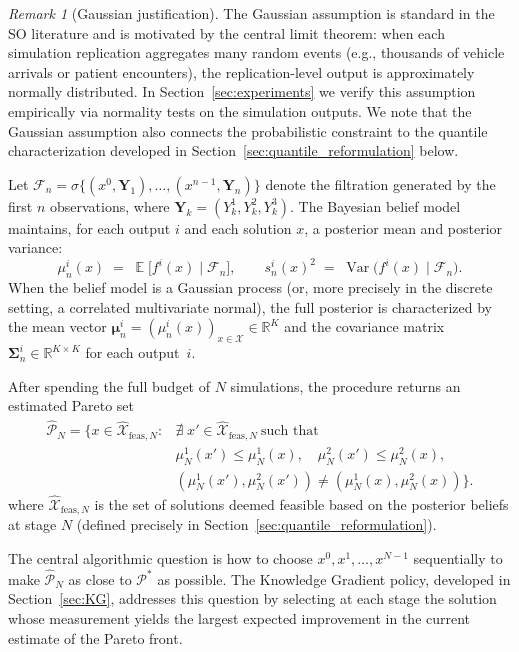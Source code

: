 \documentclass[12pt]{article}
\theoremstyle{plain}
\theoremstyle{definition}
\theoremstyle{remark}
\newtheorem{remark}{Remark}[section]
\DeclareMathOperator{\Var}{Var}
\DeclareMathOperator{\E}{\mathbb{E}}
\newcommand{\R}{\mathbb{R}}
\newcommand{\cX}{\mathcal{X}}
\newcommand{\cF}{\mathcal{F}}
\newcommand{\cP}{\mathcal{P}}
\newcommand{\bmu}{\bm{\mu}}
\newcommand{\bSigma}{\bm{\Sigma}}
\begin{document}
\begin{remark}[Gaussian justification]\label{rem:gaussian}
The Gaussian assumption is standard in the SO literature and is
motivated by the central limit theorem: when each simulation
replication aggregates many random events (e.g., thousands of vehicle
arrivals or patient encounters), the replication-level output is
approximately normally distributed.  In Section~\ref{sec:experiments} we verify this
assumption empirically via normality tests on the simulation outputs.
We note that the Gaussian assumption also connects the probabilistic
constraint to the quantile characterization developed in
Section~\ref{sec:quantile_reformulation} below.
\end{remark}

Let $\cF_n=\sigma\{(x^0,\bm{Y}_1),\ldots,(x^{n-1},\bm{Y}_n)\}$
denote the filtration generated by the first $n$ observations, where
$\bm{Y}_k=(Y^1_k,Y^2_k,Y^3_k)$.  The Bayesian belief model
maintains, for each output $i$ and each solution $x$, a posterior
mean and posterior variance:
\begin{equation}\label{eq:posterior}
  \mu^i_n(x) \;=\; \E\bigl[f^i(x)\mid\cF_n\bigr],
  \qquad
  s^i_n(x)^2 \;=\; \Var\bigl(f^i(x)\mid\cF_n\bigr).
\end{equation}
When the belief model is a Gaussian process (or, more precisely in the
discrete setting, a correlated multivariate normal), the full
posterior is characterized by the mean vector
$\bmu^i_n=(\mu^i_n(x))_{x\in\cX}\in\R^K$ and the covariance
matrix $\bSigma^i_n\in\R^{K\times K}$ for each output~$i$.

After spending the full budget of $N$ simulations, the procedure
returns an estimated Pareto set
\begin{equation}\label{eq:estimated_pareto}
  \begin{aligned}
  \hat{\cP}_N
  = \bigl\{x\in\hat{\cX}_{\mathrm{feas},N}:&
  \nexists\;x'\in\hat{\cX}_{\mathrm{feas},N}\ \text{such that} \\
  &\mu^1_N(x')\le\mu^1_N(x),\quad
  \mu^2_N(x')\le\mu^2_N(x),\\
  &(\mu^1_N(x'),\mu^2_N(x'))\ne(\mu^1_N(x),\mu^2_N(x))
  \bigr\}.
  \end{aligned}
\end{equation}
where $\hat{\cX}_{\mathrm{feas},N}$ is the set of solutions deemed
feasible based on the posterior beliefs at stage $N$ (defined
precisely in Section~\ref{sec:quantile_reformulation}).

The central algorithmic question is how to choose
$x^0,x^1,\ldots,x^{N-1}$ sequentially to make $\hat{\cP}_N$
as close to $\cP^*$ as possible.  The Knowledge Gradient policy,
developed in Section~\ref{sec:KG}, addresses this question by selecting
at each stage the solution whose measurement yields the largest
expected improvement in the current estimate of the Pareto front.
\end{document}
